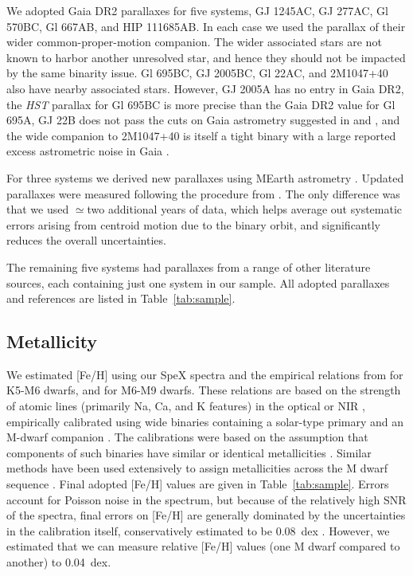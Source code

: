 \documentclass[twocolumn]{aastex62}
\begin{document}
We adopted Gaia DR2 parallaxes for five systems, GJ 1245AC, GJ 277AC, Gl 570BC, Gl 667AB, and HIP 111685AB. In each case we used the parallax of their wider common-proper-motion companion. The wider associated stars are not known to harbor another unresolved star, and hence they should not be impacted by the same binarity issue. Gl 695BC, GJ 2005BC, Gl 22AC, and 2M1047+40 also have nearby associated stars. However, GJ 2005A has no entry in Gaia DR2, the {\it HST} parallax for Gl 695BC is more precise than the Gaia DR2 value for Gl 695A, GJ 22B does not pass the cuts on Gaia astrometry suggested in \citet{GaiaDr2} and \citet{Dr2_HR}, and the wide companion to 2M1047+40 is itself a tight binary \citep[LP 213-67AB,][]{Dupuy2017} with a large reported excess astrometric noise in Gaia \citep[a sign of binarity, ][]{2018RNAAS...2...20E}.

For three systems we derived new parallaxes using MEarth astrometry \citep{Nutzman2008}. Updated parallaxes were measured following the procedure from \citet{2014ApJ...784..156D}. The only difference was that we used $\simeq$two additional years of data, which helps average out systematic errors arising from centroid motion due to the binary orbit, and significantly reduces the overall uncertainties. 

The remaining five systems had parallaxes from a range of other literature sources, each containing just one system in our sample. All adopted parallaxes and references are listed in Table~\ref{tab:sample}.



\subsection{Metallicity}\label{sec:feh}

We estimated [Fe/H] using our SpeX spectra and the empirical relations from \citet{Mann2013a} for K5-M6 dwarfs, and \citet{Mann2014} for M6-M9 dwarfs. These relations  are based on the strength of atomic lines (primarily Na, Ca, and K features) in the optical or NIR \citep[e.g.,][]{RojasAyala:2010,Terrien:2012lr}, empirically calibrated using wide binaries containing a solar-type primary and an M-dwarf companion \citep[e.g.,][]{Bonfils:2005,Johnson2009,Neves2012}. The calibrations were based on the assumption that components of such binaries have similar or identical metallicities \citep[e.g.,][]{2015ApJ...801L..10T}. Similar methods have been used extensively to assign metallicities across the M dwarf sequence \citep[e.g.,][]{Terrien2015,Muirhead2015,Dressing2017,2018ApJ...853...30V,2018ApJ...854..145M}. Final adopted [Fe/H] values are given in Table~\ref{tab:sample}. Errors account for Poisson noise in the spectrum, but because of the relatively high SNR of the spectra, final errors on [Fe/H] are generally dominated by the uncertainties in the calibration itself, conservatively estimated to be 0.08~dex \citep{Mann2013a,Mann2014}. However, we estimated that we can measure relative [Fe/H] values (one M dwarf compared to another) to 0.04~dex. 
\end{document}
